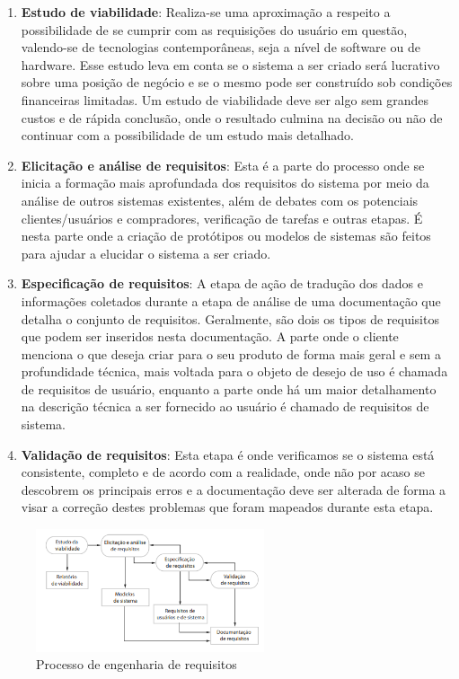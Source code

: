 \begin{enumerate}
    \item \textbf{Estudo de viabilidade}: Realiza-se uma aproximação a respeito a possibilidade de se cumprir com as requisições do usuário em questão, valendo-se de tecnologias contemporâneas, seja a nível de software ou de hardware. Esse estudo leva em conta se o sistema a ser criado será lucrativo sobre uma posição de negócio e se o mesmo pode ser construído sob condições financeiras limitadas. Um estudo de viabilidade deve ser algo sem grandes custos e de rápida conclusão, onde o resultado culmina na decisão ou não de continuar com a possibilidade de um estudo mais detalhado.
    
    \item \textbf{Elicitação e análise de requisitos}: Esta é a parte do processo onde se inicia a formação mais aprofundada dos requisitos do sistema por meio da análise de outros sistemas existentes, além de debates com os potenciais clientes/usuários e compradores, verificação de tarefas e outras etapas. É nesta parte onde a criação de protótipos ou modelos de sistemas são feitos para ajudar a elucidar o sistema a ser criado.
    
    \item \textbf{Especificação de requisitos}: A etapa de ação de tradução dos dados e informações coletados durante a etapa de análise de uma documentação que detalha o conjunto de requisitos. Geralmente, são dois os tipos de requisitos que podem ser inseridos nesta documentação. A parte onde o cliente menciona o que deseja criar para o seu produto de forma mais geral e sem a profundidade técnica, mais voltada para o objeto de desejo de uso é chamada de requisitos de usuário, enquanto a parte onde há um maior detalhamento na descrição técnica a ser fornecido ao usuário é chamado de requisitos de sistema.
    
    \item \textbf{Validação de requisitos}: Esta etapa é onde verificamos se o sistema está consistente, completo e de acordo com a realidade, onde não por acaso se descobrem os principais erros e a documentação deve ser alterada de forma a visar a correção destes problemas que foram mapeados durante esta etapa.
\end{enumerate}

\begin{figure}
    \centering
    \includegraphics[width=0.6\textwidth]{img/eng_req.png}
    \caption{Processo de engenharia de requisitos \cite{Sommerville07}}
    \label{fig:eng_req}
\end{figure}



